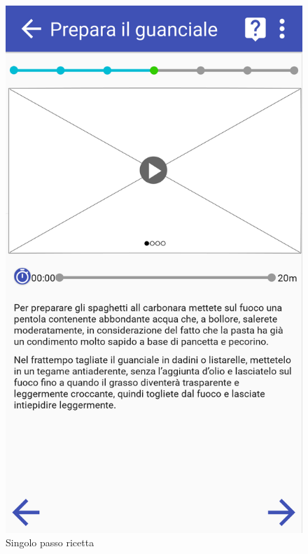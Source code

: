 \begin{figure}[H]
\begin{minipage}{.49\textwidth}
		\includegraphics[width=\textwidth]{img/wireframe/presentazione_passo_ricetta_timer_non_attivo.png}
		\caption{Singolo passo ricetta}
	\end{minipage}
\end{figure}
